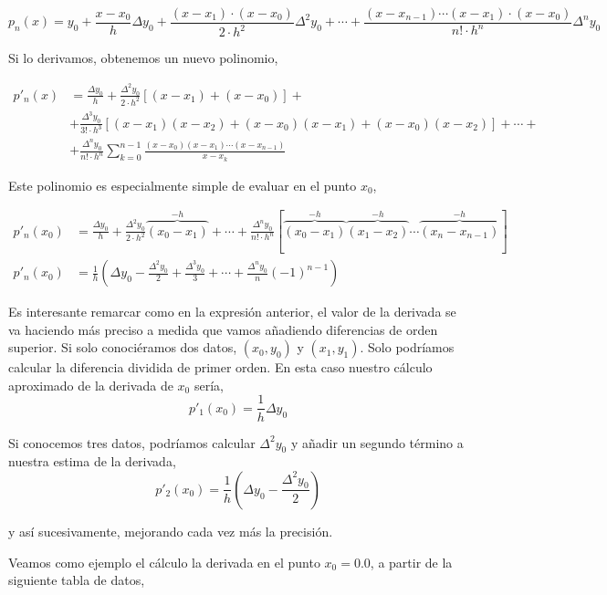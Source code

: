 \begin{equation*}
p_n(x)=y_0+\frac{x-x_0}{h}\Delta y_0+\frac{(x-x_1)\cdot (x-x_0)}{2\cdot h^2}\Delta^2 y_0+\cdots +\frac{(x-x_{n-1}) \cdots (x-x_1)\cdot (x-x_0)}{n! \cdot h^n}\Delta^n y_0
\end{equation*}

Si lo derivamos, obtenemos un nuevo polinomio,

\begin{align*}
p'_n(x)&=\frac{\Delta y_0}{h}+\frac{\Delta^2 y_0}{2\cdot h^2}\left[(x-x_1)+(x-x_0) \right] +\\
&+\frac{\Delta^3 y_0}{3! \cdot h^3}\left[(x-x_1)(x-x_2)+(x-x_0)(x-x_1)+(x-x_0)(x-x_2)\right]+\cdots +\\
&+\frac{\Delta^n y_0}{n! \cdot h^n}\sum_{k=0}^{n-1}\frac{(x-x_0)(x-x_1)\cdots (x-x_{n-1})}{x-x_k}
\end{align*}

Este polinomio es especialmente simple de evaluar en el punto $x_0$,

\begin{align*}
p'_n(x_0)&=\frac{\Delta y_0}{h}+\frac{\Delta^2 y_0}{2\cdot h^2}\overbrace{(x_0-x_1)}^{-h}+\cdots +
\frac{\Delta^n y_0}{n! \cdot h^n}[\overbrace{(x_0-x_1)}^{-h}\overbrace{(x_1-x_2)}^{-h}\cdots \overbrace{(x_n-x_{n-1})}^{-h}]\\
p'_n(x_0)&=\frac{1}{h}\left(\Delta y_0-\frac{\Delta^2 y_0}{2}+\frac{\Delta^3 y_0}{3}+\cdots +
\frac{\Delta^n y_0}{n}(-1)^{n-1}\right)
\end{align*}

Es interesante remarcar como en la expresión anterior, el valor de la derivada se va haciendo más preciso a medida que vamos añadiendo diferencias de orden superior. Si solo conociéramos dos datos, $(x_0, y_0)$ y $(x_1, y_1)$. Solo podríamos calcular la diferencia dividida de primer orden. En esta caso nuestro cálculo aproximado de la derivada de $x_0$ sería,
\begin{equation*}
p'_1(x_0)=\frac{1}{h}\Delta y_0
\end{equation*}

Si conocemos tres datos, podríamos calcular $\Delta^2y_0$ y añadir un segundo término a nuestra estima de la derivada,
\begin{equation*}
p'_2(x_0)=\frac{1}{h}\left(\Delta y_0-\frac{\Delta^2 y_0}{2}\right)
\end{equation*}

y así sucesivamente, mejorando cada vez más la precisión.

Veamos como ejemplo el cálculo la derivada en el punto $x_0=0.0$, a partir de la siguiente tabla de datos,


